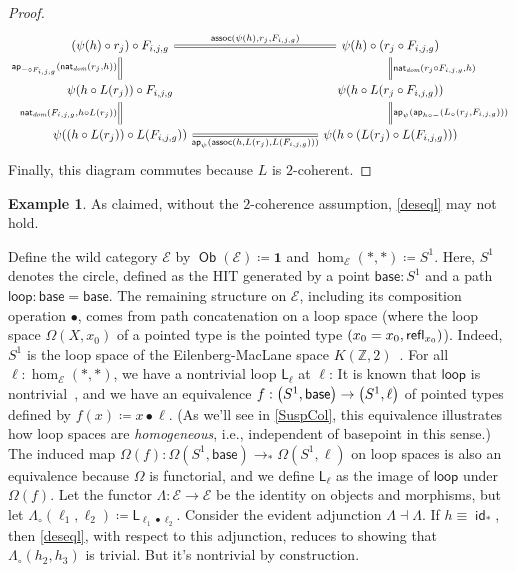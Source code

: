 \documentclass[10pt,a4paper]{article}
\theoremstyle{definition}
\newtheorem{exa}[thm]{Example}
\theoremstyle{remark}
\newcommand{\E}{\mathcal E}
\renewcommand{\L}{\mathsf L}
\newcommand{\Z}{\mathbb Z}
\newcommand{\dom}{\textit{dom}}
\newcommand{\nat}{\mathsf{nat}}
\newcommand{\base}{\mathsf{base}}
\newcommand{\loopp}{\mathsf{loop}}
\newcommand{\refl}{\mathsf{refl}}
\newcommand{\0}{\mathbf{0}}
\newcommand{\1}{\mathbf{1}}
\newcommand{\2}{\mathbf{2}}
\DeclareMathOperator{\assoc}{\mathsf{assoc}}
\DeclareMathOperator{\ap}{\mathsf{ap}}
\DeclareMathOperator{\idd}{\mathsf{id}}
\DeclareMathOperator{\obb}{\mathsf{Ob}}
\begin{document}
\begin{proof}
\[\begin{tikzcd}[column sep = 50]
	{\mleft( \psi(h) \circ r_j\mright) \circ F_{i,j,g}} && {\psi(h) \circ \mleft(r_j \circ F_{i,j,g}\mright)} \\
	{\psi(h \circ L(r_j)) \circ F_{i,j,g}} && {\psi(h \circ L(r_j \circ F_{i,j,g}))} \\
	{\psi(\mleft(h \circ L(r_j)\mright) \circ L(F_{i,j,g}))} && {\psi(h \circ \mleft(L(r_j) \circ L(F_{i,j,g}) \mright))}
	\arrow["{\assoc(\psi(h), r_j, F_{i,j,g})}", Rightarrow, no head, from=1-1, to=1-3]
	\arrow["{\nat_{\dom}(r_j \circ F_{i,j,g}, h)}", Rightarrow, no head, from=1-3, to=2-3]
	\arrow["{\ap_{{-} \circ F_{i,j,g}}(\nat_{\dom}(r_j,h))}", Rightarrow, no head, from=2-1, to=1-1]
	\arrow["{\ap_{\psi}(\ap_{h \circ {-}}(L_{\circ}(r_j,F_{i,j,g})))}", Rightarrow, no head, from=2-3, to=3-3]
	\arrow["{\nat_{\dom}(F_{i,j,g},h \circ L(r_j))}", Rightarrow, no head, from=3-1, to=2-1]
	\arrow["{\ap_{\psi}(\assoc(h, L(r_j), L(F_{i,j,g})))}"', Rightarrow, no head, from=3-1, to=3-3]
\end{tikzcd}\] Finally, this diagram commutes because $L$ is $2$-coherent.
\end{proof}


\begin{exa} \label{eq-counter}
As claimed, without the $2$-coherence assumption, \eqref{deseql} may not hold. 

Define the wild category $\E$ by $\obb(\E) \coloneqq \1$ and $\hom_{\E}(\ast, \ast) \coloneqq S^1$. Here, $S^1$ denotes the circle, defined as the HIT generated by 
a point $\base : S^1$ and a path $\loopp : \base = \base$. The remaining structure on $\E$, including its composition operation $\bullet$, comes from path concatenation on a loop space (where the loop space $\Omega(X,x_0)$ of a pointed type is the pointed type $\mleft(x_0=x_0, \refl_{x_0}\mright)$). Indeed, $S^1$ is the loop space of the Eilenberg-MacLane space $K(\Z, 2)$~\cite{EMS}. For all $\ell : \hom_{\E}(\ast, \ast)$, we have a nontrivial loop $\L_{\ell}$ at $\ell$: It is known that $\loopp$ is nontrivial~\cite[Lemma 6.4.1]{Uni13}, and we have an equivalence $f : \mleft(S^1, \base \mright) \to \mleft(S^1 , \ell\mright)$ of pointed types defined by $f(x) \coloneqq x \bullet \ell$. (As we'll see in \cref{SuspCol}, this equivalence illustrates how loop spaces are \emph{homogeneous}, i.e., independent of basepoint in this sense.) The induced map $\Omega(f) : \Omega(S^1, \base) \to_{\ast} \Omega(S^1,\ell) $ on loop spaces is also an equivalence because $\Omega$ is functorial, and we define $\L_{\ell}$ as the image of $\loopp$ under $\Omega(f)$.
Let the functor $\Lambda : \E \to \E$ be the identity on objects and morphisms, but let $\Lambda_{\circ}(\ell_1, \ell_2) \coloneqq \L_{\ell_1 \bullet \ell_2}$.
Consider the evident adjunction $\Lambda \dashv \Lambda$. If $h \equiv \idd_{\ast}$, then \eqref{deseql}, with respect to this adjunction, reduces to showing that $\Lambda_{\circ} (h_2, h_3)$ is trivial. But it's nontrivial by construction.
\end{exa}
\end{document}
